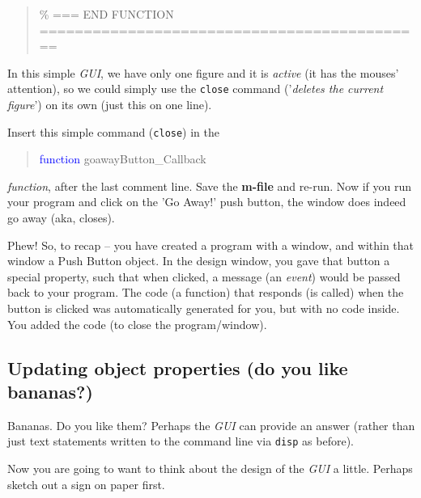 \documentclass{tufte-book} %
\newenvironment{docspec}{\begin{quotation}\ttfamily\parskip0pt\parindent0pt\ignorespaces}{\end{quotation}}
\begin{document}
\begin{docspec}
\textcolor[rgb]{0,0.501961,0}{\% === END FUNCTION ============================================}
\end{docspec}

In this simple \textit{GUI}, we have only one figure and it is \textit{active} (it has the mouses' attention), so we could simply use the \texttt{close} command ('\textit{deletes the current figure}') on its own (just this on one line). 

Insert this simple command (\texttt{close}) in the
\begin{docspec}
\textcolor{blue}{function} goawayButton\_Callback
\end{docspec}
 \textit{function}, after the last comment line. Save the \textbf{m-file} and re-run. Now if you run your program and click on the 'Go Away!' push button, the window does indeed go away (aka, closes).

Phew! So, to recap -- you have created a program with a window, and within that window a \textsf{Push Button} object.
In the design window, you gave that button a special property, such that when clicked, a message (an \textit{event}) would be passed back to your program. The code (a function) that responds (is called) when the button is clicked was automatically generated for you, but with no code inside. You added the code (to close the program/window).


\subsection{Updating object properties (do you like bananas?)}

Bananas. Do you like them? Perhaps the \textit{GUI} can provide an answer (rather than just text statements written  to the command line via \texttt{disp} as before).

Now you are going to want to think about the design of the \textit{GUI} a little. Perhaps sketch out a sign on paper first.
\end{document}
